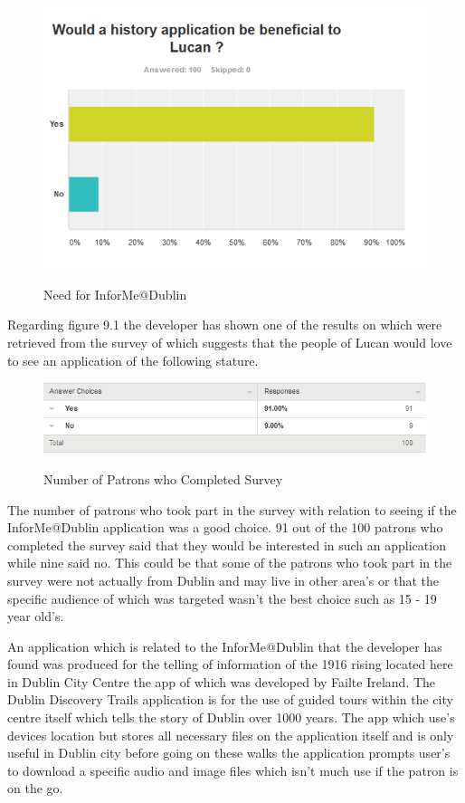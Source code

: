 \begin{figure}[htbp]
    \center \includegraphics[width=350pt]{Lucan}\\
    \caption{Need for InforMe@Dublin} \label{Figure: Need for InforMe@Dublin}
\end{figure}

Regarding figure 9.1 the developer has shown one of the results on which were retrieved from the survey of which suggests that the people of Lucan would love to see an application of the following stature.

\begin{figure}[htbp]
    \center \includegraphics[width=350pt]{Lucanresponces}\\
    \caption{Number of Patrons who Completed Survey} \label{Figure: Number of Patrons who Completed Survey}
\end{figure}

The number of patrons who took part in the survey with relation to seeing if the InforMe@Dublin application was a good choice. 91 out of the 100 patrons who completed the survey said that they would be interested in such an application while nine said no. This could be that some of the patrons who took part in the survey were not actually from Dublin and may live in other area's or that the specific audience of which was targeted wasn't the best choice such as 15 - 19 year old's.

An application which is related to the InforMe@Dublin that the developer has found was produced for the telling of information of the 1916 rising located here in Dublin City Centre the app of which was developed by Failte Ireland. The Dublin Discovery Trails application is for the use of guided tours within the city centre itself which tells the story of Dublin over 1000 years. The app which use's devices location but stores all necessary files on the application itself and is only useful in Dublin city before going on these walks the application prompts user's to download a specific audio and image files which isn't much use if the patron is on the go.

